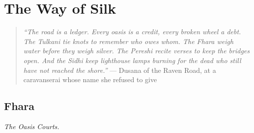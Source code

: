 \part{The Way of Silk}

\begin{quote}
  \small
  \textit{``The road is a ledger. Every oasis is a credit, every broken wheel a debt. The Tulkani tie knots to remember who owes whom. The Fhara weigh water before they weigh silver. The Pereshi recite verses to keep the bridges open. And the Sidhi keep lighthouse lamps burning for the dead who still have not reached the shore.''}
  \noindent --- Dusana of the Raven Road, at a caravanserai whose name she refused to give
  \end{quote}
\chapter{Fhara}
\emph{The Oasis Courts.}

